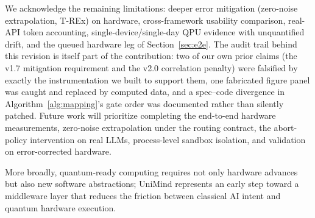 ﻿\documentclass[12pt,a4paper]{article}
\begin{document}
We acknowledge the remaining limitations: deeper error mitigation (zero-noise extrapolation, T-REx) on hardware, cross-framework usability comparison, real-API token accounting, single-device/single-day QPU evidence with unquantified drift, and the queued hardware leg of Section~\ref{sec:e2e}. The audit trail behind this revision is itself part of the contribution: two of our own prior claims (the v1.7 mitigation requirement and the v2.0 correlation penalty) were falsified by exactly the instrumentation we built to support them, one fabricated figure panel was caught and replaced by computed data, and a spec--code divergence in Algorithm~\ref{alg:mapping}'s gate order was documented rather than silently patched. Future work will prioritize completing the end-to-end hardware measurements, zero-noise extrapolation under the routing contract, the abort-policy intervention on real LLMs, process-level sandbox isolation, and validation on error-corrected hardware.

More broadly, quantum-ready computing requires not only hardware advances but also new software abstractions; UniMind represents an early step toward a middleware layer that reduces the friction between classical AI intent and quantum hardware execution.
\end{document}
